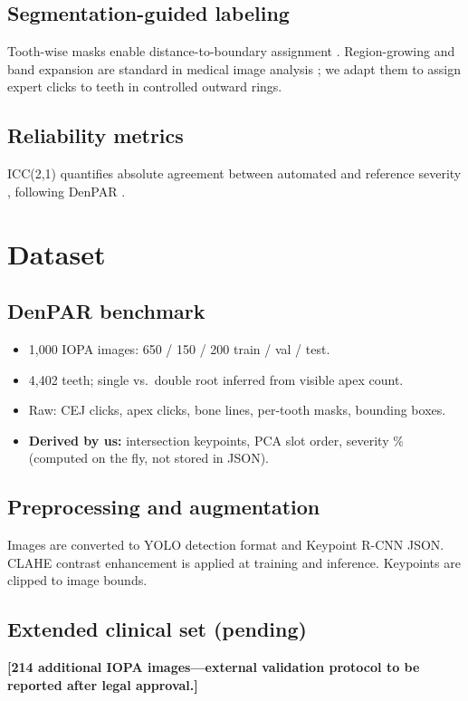 \documentclass[conference]{IEEEtran}
\newcommand{\placeholder}[1]{\textcolor{placeholdergreen}{\textbf{[#1]}}}
\begin{document}
\subsection{Segmentation-guided labeling}
Tooth-wise masks enable distance-to-boundary assignment \cite{chen2017deeplab}. Region-growing and band expansion are standard in medical image analysis \cite{kassam2020regiongrowing}; we adapt them to assign expert clicks to teeth in controlled outward rings.

\subsection{Reliability metrics}
ICC(2,1) quantifies absolute agreement between automated and reference severity \cite{shrout1979icc,koo2016icc}, following DenPAR \cite{denpar2026}.

\section{Dataset}
\label{sec:dataset}

\subsection{DenPAR benchmark}
\begin{itemize}
  \item 1{,}000 IOPA images: 650 / 150 / 200 train / val / test.
  \item 4{,}402 teeth; single vs.\ double root inferred from visible apex count.
  \item Raw: CEJ clicks, apex clicks, bone lines, per-tooth masks, bounding boxes.
  \item \textbf{Derived by us:} intersection keypoints, PCA slot order, severity \% (computed on the fly, not stored in JSON).
\end{itemize}

\subsection{Preprocessing and augmentation}
Images are converted to YOLO detection format and Keypoint R-CNN JSON. CLAHE contrast enhancement \cite{lin2014clahe} is applied at training and inference. Keypoints are clipped to image bounds.

\subsection{Extended clinical set (pending)}
\placeholder{214 additional IOPA images---external validation protocol to be reported after legal approval.}
\end{document}
